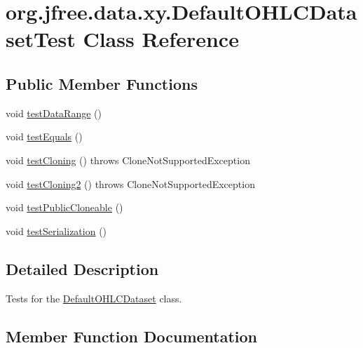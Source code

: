 \hypertarget{classorg_1_1jfree_1_1data_1_1xy_1_1_default_o_h_l_c_dataset_test}{}\section{org.\+jfree.\+data.\+xy.\+Default\+O\+H\+L\+C\+Dataset\+Test Class Reference}
\label{classorg_1_1jfree_1_1data_1_1xy_1_1_default_o_h_l_c_dataset_test}
\subsection*{Public Member Functions}
\begin{DoxyCompactItemize}
\item 
void \mbox{\hyperlink{classorg_1_1jfree_1_1data_1_1xy_1_1_default_o_h_l_c_dataset_test_aeefbada7f742c196abde6a638cfcaad9}{test\+Data\+Range}} ()
\item 
void \mbox{\hyperlink{classorg_1_1jfree_1_1data_1_1xy_1_1_default_o_h_l_c_dataset_test_acdde3a90f5601a74cf32af4259179a1e}{test\+Equals}} ()
\item 
void \mbox{\hyperlink{classorg_1_1jfree_1_1data_1_1xy_1_1_default_o_h_l_c_dataset_test_a49cae145129232ba6599da67d675971a}{test\+Cloning}} ()  throws Clone\+Not\+Supported\+Exception 
\item 
void \mbox{\hyperlink{classorg_1_1jfree_1_1data_1_1xy_1_1_default_o_h_l_c_dataset_test_a62b31f48622947c50b429b7b1adb76e6}{test\+Cloning2}} ()  throws Clone\+Not\+Supported\+Exception 
\item 
void \mbox{\hyperlink{classorg_1_1jfree_1_1data_1_1xy_1_1_default_o_h_l_c_dataset_test_a236228dcde687453c6c3561b97b24bc5}{test\+Public\+Cloneable}} ()
\item 
void \mbox{\hyperlink{classorg_1_1jfree_1_1data_1_1xy_1_1_default_o_h_l_c_dataset_test_aca2e6386d88abb6d69107c06b62413c6}{test\+Serialization}} ()
\end{DoxyCompactItemize}


\subsection{Detailed Description}
Tests for the \mbox{\hyperlink{classorg_1_1jfree_1_1data_1_1xy_1_1_default_o_h_l_c_dataset}{Default\+O\+H\+L\+C\+Dataset}} class. 

\subsection{Member Function Documentation}
\mbox{\label{classorg_1_1jfree_1_1data_1_1xy_1_1_default_o_h_l_c_dataset_test_a49cae145129232ba6599da67d675971a}} 
